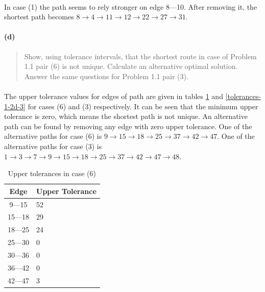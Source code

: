 \paragraph{}
In case (1) the path seems to rely stronger on edge 8---10. After removing it, the shortest path becomes $8 \rightarrow 4 \rightarrow 11 \rightarrow 12 \rightarrow 22 \rightarrow 27 \rightarrow 31$.

\paragraph{(d)}
\begin{quote}
Show, using tolerance intervals, that the shortest route in case of Problem 1.1 pair (6) is not unique. Calculate an alternative optimal solution. Answer the same questions for Problem 1.1 pair (3).
\end{quote}

\paragraph{}
The upper tolerance values for edges of path are given in tables \ref{tolerances-1-2d-6} and \ref{tolerances-1-2d-3} for cases (6) and (3) respectively. It can be seen that the minimum upper tolerance is zero, which means the shortest path is not unique. An alternative path can be found by removing any edge with zero upper tolerance. One of the  alternative paths for case (6) is $ 9 \rightarrow 15 \rightarrow 18 \rightarrow 25 \rightarrow 37 \rightarrow 42 \rightarrow 47 $. One of the alternative paths for case (3) is $ 1 \rightarrow 3 \rightarrow 7 \rightarrow 9 \rightarrow 15 \rightarrow 18 \rightarrow 25 \rightarrow 37 \rightarrow 42 \rightarrow 47 \rightarrow 48 $.

\begin{table}[H]
\centering
\begin{tabular}{|c|l|}
\hline
Edge & Upper Tolerance \\ \hline
9---15 & 52 \\ \hline
15---18 & 29 \\ \hline
18---25 & 24 \\ \hline
25---30 & 0 \\ \hline
30---36 & 0 \\ \hline
36---42 & 0 \\ \hline
42---47 & 3 \\ \hline
\end{tabular}
\caption{Upper tolerances in case (6)}
\label{tolerances-1-2d-6}
\end{table}


